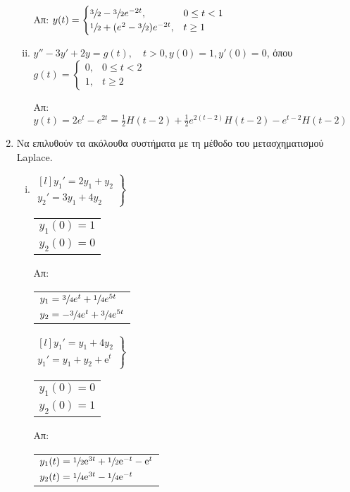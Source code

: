 \begin{enumerate}
\begin{enumerate}[i)]
        \hfill Απ: $y(t)=
        \begin{cases} 
          \sfrac{3}{2}-\sfrac{3}{2}e^{-2t},& 0\leq t<1 \\ 
          \sfrac{1}{2}+(e^2-\sfrac{3}{2})e^{-2t}, & t\geq 1
        \end{cases}$

      \item $y''-3y'+2y=g(t),\quad t>0, y(0)=1, y'(0)=0$, 
        όπου $g(t)=
        \begin{cases} 
          0, & 0\leq t<2 \\ 1, & t\geq 2
        \end{cases}$

        \hfill Απ: $y(t)=2e^t-e^{2t}=\frac{1}{2}H(t-2)+
        \frac{1}{2}e^{2(t-2)}H(t-2)-e^{t-2}H(t-2)$
    \end{enumerate}

  \item Να επιλυθούν τα ακόλουθα συστήματα με τη μέθοδο του μετασχηματισμού Laplace.
    \begin{enumerate}[i)]
      \item 
        $ 
        \left.
          \begin{matrix*}[l]
          y_1'=2y_1+y_2 \\ y_2'=3y_1+4y_2
          \end{matrix*} 
        \right\} $ 
        \quad {} \quad 
        \begin{tabular}{l}
          $ y_{1}(0)=1 $ \\
          $ y_{2}(0)=0 $ 
        \end{tabular}
        \hfill Απ: 
        \begin{tabular}{l} 
          $y_1=\sfrac{3}{4}e^{t}+ \sfrac{1}{4} e^{5t}$ \\
          $y_2=-\sfrac{3}{4}e^{t}+\sfrac{3}{4}e^{5t}$
        \end{tabular}

        $ 
        \left.
          \begin{matrix*}[l]
            y_{1}' =  y_{1}+ 4y_{2} \\
            y_{1}' = y_{1}+  y_{2}+ \mathrm{e}^{t} 
          \end{matrix*} 
        \right\} $ \quad {} \quad 
        \begin{tabular}{l}
          $y_{1}(0)=0$ \\
          $y_{2}(0) =1$
        \end{tabular} 
        \hfill Απ: 
        \begin{tabular}{l}
          $ y_{1}(t) = \sfrac{1}{2} \mathrm{e}^{3t} + \sfrac{1}{2}
          \mathrm{e}^{-t} - \mathrm{e}^{t} $
          \\
          $ y_{2}(t) = \sfrac{1}{4} \mathrm{e}^{3t} - \sfrac{1}{4} \mathrm{e}^{-t} $
        \end{tabular}


\end{enumerate}
\end{enumerate}
